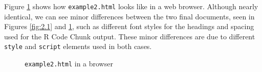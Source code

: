 \documentclass[a4paper, 12pt]{report}
\begin{document}
Figure \ref{fig:3.1} shows how \texttt{example2.html} looks like in a web browser. Although nearly identical, we can see minor differences between the two final documents, seen in Figures \ref{fig:2.1} and \ref{fig:3.1}, such as different font styles for the headings and spacing used for the R Code Chunk output. These minor differences are due to different \texttt{style} and \texttt{script} elements used in both cases.
\begin{figure}[h!]
\caption{\texttt{example2.html} in a browser}
\label{fig:3.1}
\end{figure}



\newpage
\end{document}
